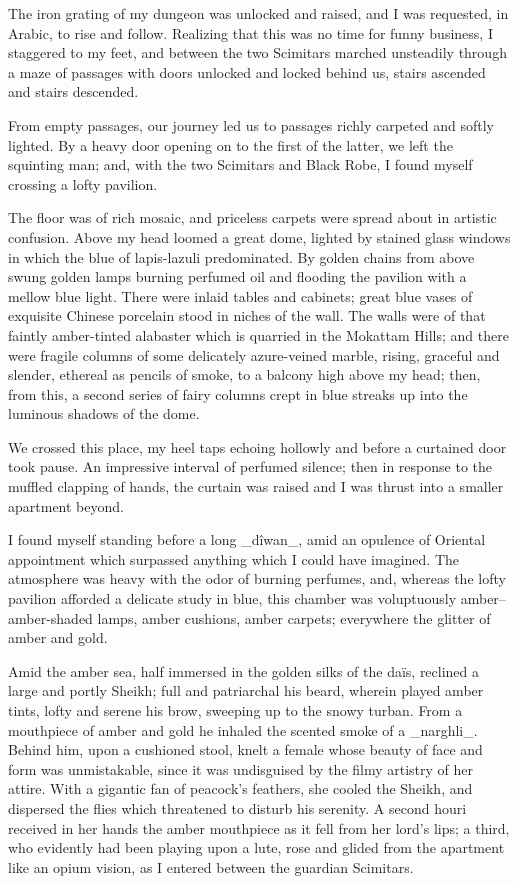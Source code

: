 The iron grating of my dungeon was unlocked and raised, and I was
requested, in Arabic, to rise and follow. Realizing that this was no
time for funny business, I staggered to my feet, and between the two
Scimitars marched unsteadily through a maze of passages with doors
unlocked and locked behind us, stairs ascended and stairs descended.

From empty passages, our journey led us to passages richly carpeted
and softly lighted. By a heavy door opening on to the first of the
latter, we left the squinting man; and, with the two Scimitars and
Black Robe, I found myself crossing a lofty pavilion.

The floor was of rich mosaic, and priceless carpets were spread about
in artistic confusion. Above my head loomed a great dome, lighted by
stained glass windows in which the blue of lapis-lazuli predominated.
By golden chains from above swung golden lamps burning perfumed oil
and flooding the pavilion with a mellow blue light. There were inlaid
tables and cabinets; great blue vases of exquisite Chinese porcelain
stood in niches of the wall. The walls were of that faintly
amber-tinted alabaster which is quarried in the Mokattam Hills; and
there were fragile columns of some delicately azure-veined marble,
rising, graceful and slender, ethereal as pencils of smoke, to a
balcony high above my head; then, from this, a second series of fairy
columns crept in blue streaks up into the luminous shadows of the
dome.

We crossed this place, my heel taps echoing hollowly and before a
curtained door took pause. An impressive interval of perfumed silence;
then in response to the muffled clapping of hands, the curtain was
raised and I was thrust into a smaller apartment beyond.

I found myself standing before a long _dîwan_, amid an opulence of
Oriental appointment which surpassed anything which I could have
imagined. The atmosphere was heavy with the odor of burning perfumes,
and, whereas the lofty pavilion afforded a delicate study in blue,
this chamber was voluptuously amber--amber-shaded lamps, amber
cushions, amber carpets; everywhere the glitter of amber and gold.

Amid the amber sea, half immersed in the golden silks of the daïs,
reclined a large and portly Sheikh; full and patriarchal his beard,
wherein played amber tints, lofty and serene his brow, sweeping up to
the snowy turban. From a mouthpiece of amber and gold he inhaled the
scented smoke of a _narghli_. Behind him, upon a cushioned stool,
knelt a female whose beauty of face and form was unmistakable, since
it was undisguised by the filmy artistry of her attire. With a
gigantic fan of peacock's feathers, she cooled the Sheikh, and
dispersed the flies which threatened to disturb his serenity. A second
houri received in her hands the amber mouthpiece as it fell from her
lord's lips; a third, who evidently had been playing upon a lute, rose
and glided from the apartment like an opium vision, as I entered
between the guardian Scimitars.

